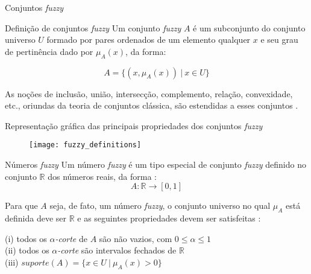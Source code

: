\begin{frame}{Conjuntos \emph{fuzzy}}

\begin{block}{Definição de conjuntos \emph{fuzzy}}
Um conjunto \emph{fuzzy} $A$ é um subconjunto do conjunto universo $U$ formado por pares ordenados de um elemento qualquer $x$ e seu grau de pertinência dado por $\mu_A(x)$, da forma:

\begin{equation*}
  A =  \{(x, \mu_A(x)) \ |\ x \in U\}
\end{equation*}
\end{block}

As noções de inclusão, união, intersecção, complemento, relação, convexidade, etc., oriundas da teoria de conjuntos clássica, são estendidas a esses conjuntos \citep{zadeh:65}.

\end{frame}

\begin{frame}{Representação gráfica das principais propriedades dos conjuntos \emph{fuzzy}}
\begin{figure}[!h]
  \centering
  \texttt{[image: fuzzy\_definitions]}
\end{figure}
\end{frame}

\begin{frame}{Números \emph{fuzzy}}
Um número \emph{fuzzy} é um tipo especial de conjunto \emph{fuzzy} definido no conjunto $\mathbb{R}$ dos números reais, da forma \citep{klir:95}:
\begin{equation*}
  A : \mathbb{R} \rightarrow [0, 1]
\end{equation*}

Para que $A$ seja, de fato, um número \emph{fuzzy}, o conjunto universo no qual $\mu_A$ está definida deve ser $\mathbb{R}$ e as seguintes propriedades devem ser satisfeitas \citep{barros:06}:

\hspace{4pt}(i) todos os $\alpha$\emph{-corte} de $A$ são não vazios, com $0 \leq \alpha \leq 1$\\
\hspace{2pt}(ii) todos os $\alpha$\emph{-corte} são intervalos fechados de $\mathbb{R}$\\
(iii) $suporte(A) = \{x \in U \ |\ \mu_A(x) > 0\}$

\end{frame}

